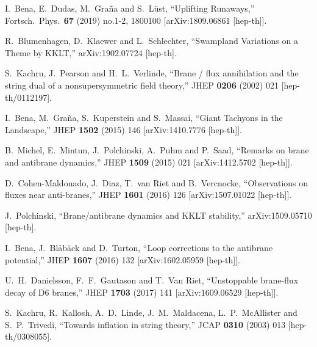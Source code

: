 \documentclass[12pt]{article}
\numberwithin{equation}{section}
\begin{document}
\begin{thebibliography}{999}
  I.~Bena, E.~Dudas, M.~Graña and S.~Lüst,
  ``Uplifting Runaways,''
  Fortsch.\ Phys.\  {\bf 67} (2019) no.1-2,  1800100
  [arXiv:1809.06861 [hep-th]].

  R.~Blumenhagen, D.~Klaewer and L.~Schlechter,
  ``Swampland Variations on a Theme by KKLT,''
  arXiv:1902.07724 [hep-th].

  S.~Kachru, J.~Pearson and H.~L.~Verlinde,
  ``Brane / flux annihilation and the string dual of a nonsupersymmetric 
  field theory,''
  JHEP {\bf 0206} (2002) 021
  [hep-th/0112197].

  I.~Bena, M.~Graña, S.~Kuperstein and S.~Massai,
  ``Giant Tachyons in the Landscape,''
  JHEP {\bf 1502} (2015) 146
  [arXiv:1410.7776 [hep-th]].

  B.~Michel, E.~Mintun, J.~Polchinski, A.~Puhm and P.~Saad,
  ``Remarks on brane and antibrane dynamics,''
  JHEP {\bf 1509} (2015) 021
  [arXiv:1412.5702 [hep-th]].

  D.~Cohen-Maldonado, J.~Diaz, T.~van Riet and B.~Vercnocke,
  ``Observations on fluxes near anti-branes,''
  JHEP {\bf 1601} (2016) 126
  [arXiv:1507.01022 [hep-th]].

  J.~Polchinski,
  ``Brane/antibrane dynamics and KKLT stability,''
  arXiv:1509.05710 [hep-th].

  I.~Bena, J.~Blåbäck and D.~Turton,
  ``Loop corrections to the antibrane potential,''
  JHEP {\bf 1607} (2016) 132
  [arXiv:1602.05959 [hep-th]].

  U.~H.~Danielsson, F.~F.~Gautason and T.~Van Riet,
  ``Unstoppable brane-flux decay of $ \overline{\mathrm{D}6} $ branes,''
  JHEP {\bf 1703} (2017) 141
  [arXiv:1609.06529 [hep-th]].

  S.~Kachru, R.~Kallosh, A.~D.~Linde, J.~M.~Maldacena, L.~P.~McAllister 
  and S.~P.~Trivedi, ``Towards inflation in string theory,''
  JCAP {\bf 0310} (2003) 013 [hep-th/0308055].


\end{thebibliography}
\end{document}
